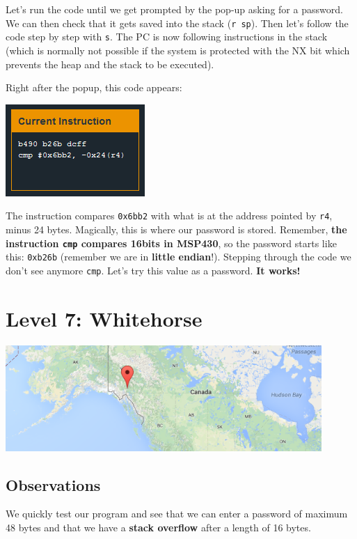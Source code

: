 Let's run the code until we get prompted by the pop-up asking for a
password. We can then check that it gets saved into the stack
(\texttt{r sp}). Then let's follow the code step by step with
\texttt{s}. The PC is now following instructions in the stack (which is
normally not possible if the system is protected with the NX bit which
prevents the heap and the stack to be executed).

Right after the popup, this code appears:

\includegraphics{img/6_2.PNG}

The instruction compares \texttt{0x6bb2} with what is at the address
pointed by \texttt{r4}, minus 24 bytes. Magically, this is where our
password is stored. Remember, \textbf{the instruction \texttt{cmp}
compares 16bits in MSP430}, so the password starts like this:
\texttt{0xb26b} (remember we are in \textbf{little endian}!). Stepping
through the code we don't see anymore \texttt{cmp}. Let's try this value
as a password. \textbf{It works!}

\section{Level 7: Whitehorse}\label{level-7-whitehorse}

\includegraphics{img/7_1.PNG}

\subsection{Observations}\label{observations-3}

We quickly test our program and see that we can enter a password of
maximum 48 bytes and that we have a \textbf{stack overflow} after a
length of 16 bytes.

